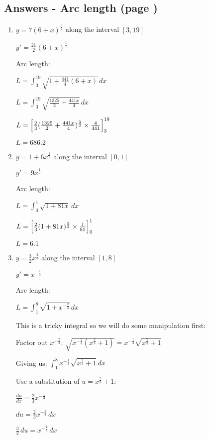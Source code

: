 \documentclass[../main.tex]{subfiles}
\begin{document}
\subsection*{Answers - Arc length (page \pageref{Arc length})}

\begin{enumerate}[itemsep=0.7cm]
    \item 
    $y=7(6+x)^{\frac{3}{2}}$ along the interval $[3,19]$

    $y'=\frac{21}{2}(6+x)^{\frac{1}{2}}$

    Arc length:

    $L=\int_3^{19} \sqrt{1+\frac{441}{4}(6+x)}\,dx$

    $L=\int_3^{19} \sqrt{\frac{1325}{2}+\frac{441x}{4}}\,dx$

    $L=\Bigl[\frac{2}{3}(\frac{1325}{2}+\frac{441x}{4})^{\frac{3}{2}}\times \frac{4}{441}\Bigr]_3^{19}$

    $L=686.2$

    \item
    $y=1+6x^{\frac{3}{2}}$ along the interval $[0,1]$

    $y'=9x^{\frac{1}{2}}$

    Arc length:

    $L=\int_0^1 \sqrt{1+81x}\,dx$

    $L=\Bigl[\frac{2}{3}(1+81x)^{\frac{3}{2}}\times \frac{1}{81}\Bigr]_0^1$

    $L=6.1$

    \item 
    $y=\frac{3}{2}x^{\frac{2}{3}}$ along the interval $[1,8]$

    $y'=x^{-\frac{1}{3}}$

    Arc length:

    $L=\int_1^8 \sqrt{1+x^{-\frac{2}{3}}}\,dx$

    This is a tricky integral so we will do some manipulation first:

    Factor out $x^{-\frac{2}{3}}$: $\sqrt{x^{-\frac{2}{3}}(x^{\frac{2}{3}}+1)}=x^{-\frac{1}{3}}\sqrt{x^{\frac{2}{3}}+1}$

    Giving us: $\int_1^8 x^{-\frac{1}{3}}\sqrt{x^{\frac{2}{3}}+1}\,dx$

    Use a substitution of $u=x^{\frac{2}{3}}+1$:

    $\frac{du}{dx}=\frac{2}{3}x^{-\frac{1}{3}}$

    $du=\frac{2}{3}x^{-\frac{1}{3}}\,dx$

    $\frac{3}{2}\,du=x^{-\frac{1}{3}}\,dx$


\end{enumerate}
\end{document}
